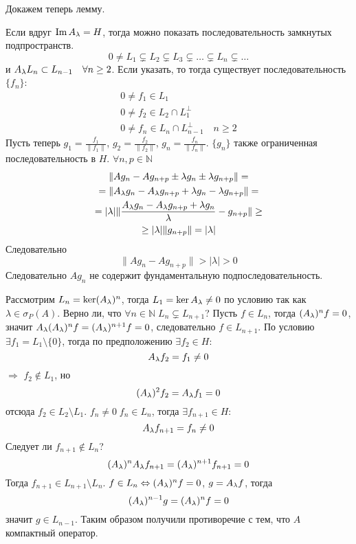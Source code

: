 \documentclass[14pt]{extarticle}
\begin{document}
Докажем теперь лемму.
\begin{Proof}
    Если вдруг $\operatorname{Im} A_\lambda = H$, тогда можно показать последовательность
    замкнутых подпространств.
    $$
    0 \ne L_1 \varsubsetneq L_2 \varsubsetneq L_3 \varsubsetneq \dots 
    \varsubsetneq L_n \varsubsetneq \dots
    $$
    и $A_\lambda L_n \subset L_{n - 1}\quad \forall n \ge 2$.
    Если указать, то тогда существует последовательность $\{f_n\}$:
    \begin{gather*}
        0 \ne f_1 \in L_1\\
        0 \ne f_2 \in L_2 \cap L_1^\perp\\
        0 \ne f_n \in L_n \cap L_{n - 1}^\perp\quad n \ge 2
    \end{gather*}
    Пусть теперь $g_1 = \frac{f_1}{\|f_1\|}$, $g_2 = \frac{f_2}{\|f_2\|}$, 
    $g_n = \frac{f_n}{\|f_n\|}$.
    $\{g_n\}$ также ограниченная последовательность в $H$.
    $\forall n, p \in \mathbb N$
    \begin{multline*}
        \|Ag_n - Ag_{n + p} \pm \lambda g_n \pm \lambda g_{n + p}\| =\\
        = \|A_\lambda g_n - A_\lambda g_{n + p} + \lambda g_n - \lambda g_{n + p}\| =\\
        = |\lambda|\|\frac{A_\lambda g_n - A_\lambda g_{n + p} + \lambda g_n}{\lambda} -
        g_{n + p}\| \ge\\\ge |\lambda| \|g_{n + p}\| = |\lambda|
    \end{multline*}
    Следовательно
    $$
    \|A g_n - A g_{n + p}\| > |\lambda| > 0
    $$
    Следовательно $A g_n$ не содержит фундаментальную подпоследовательность.
    
    Рассмотрим $L_n = \ker(A_\lambda)^n$, тогда $L_1 = \ker A_\lambda \ne 0$ по условию
    так как $\lambda \in \sigma_P(A)$.
    Верно ли, что $\forall n \in \mathbb{N}\; L_n \varsubsetneq L_{n + 1}$?
    Пусть $f \in L_n$, тогда $(A_\lambda)^nf = 0$, значит $A_\lambda (A_\lambda)^n f = (A_\lambda)^{n
    + 1}f = 0$, следовательно $f \in L_{n + 1}$.
    По условию $\exists f_1 = L_1 \setminus \{0\}$, тогда по предположению
    $\exists f_2 \in H$:
    $$
    A_\lambda f_2 = f_1 \ne 0
    $$
    $\Rightarrow$ $f_2 \notin L_1$, но
    $$
    (A_\lambda)^2 f_2 = A_\lambda f_1 = 0
    $$
    отсюда $f_2 \in L_2 \setminus L_1$.
    $f_n \ne 0\; f_n \in L_n$, тогда $\exists f_{n + 1} \in H$:
    $$
    A_\lambda f_{n + 1} = f_n \ne 0
    $$
    Следует ли $f_{n + 1} \notin L_n$?
    $$
    (A_\lambda)^n A_\lambda f_{n + 1} = (A_\lambda)^{n + 1} f_{n + 1} = 0
    $$
    Тогда $f_{n + 1} \in L_{n + 1}\setminus L_n$.
    $f \in L_n \Leftrightarrow (A_\lambda)^n f = 0$, $g = A_\lambda f$, тогда
    $$
    (A_\lambda)^{n - 1}g = (A_\lambda)^n f = 0
    $$
    значит $g \in L_{n - 1}$.
    Таким образом получили противоречие с тем, что $A$ компактный оператор.
\end{Proof}
\end{document}
